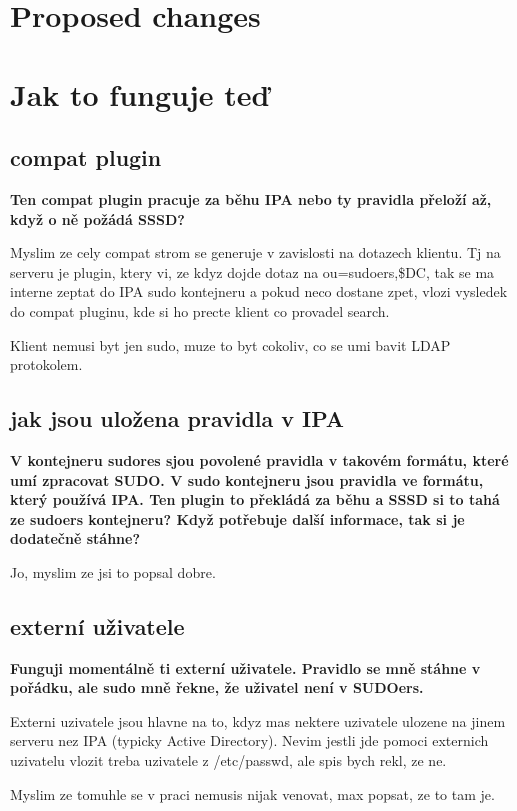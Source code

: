 \documentclass[12pt,a4paper,titlepage,final]{article}
\begin{document}
\section{Proposed changes}

\section{Jak to funguje teď}
\subsection{compat plugin}
\textbf{Ten compat plugin pracuje za běhu IPA nebo ty pravidla přeloží až, když
o ně požádá SSSD?}

Myslim ze cely compat strom se generuje v zavislosti na dotazech klientu. Tj
na serveru je plugin, ktery vi, ze kdyz dojde dotaz na ou=sudoers,\$DC,
tak se ma interne zeptat do IPA sudo kontejneru a pokud neco dostane zpet,
vlozi vysledek do compat pluginu, kde si ho precte klient co provadel search.

Klient nemusi byt jen sudo, muze to byt cokoliv, co se umi bavit LDAP
protokolem.

\subsection{jak jsou uložena pravidla v IPA}
\textbf{V kontejneru sudores sjou povolené pravidla v takovém formátu, které umí
zpracovat SUDO. V sudo kontejneru jsou pravidla ve formátu, který používá IPA.
Ten plugin to překládá za běhu a SSSD si to tahá ze sudoers kontejneru? Když
potřebuje další informace, tak si je dodatečně stáhne?}

Jo, myslim ze jsi to popsal dobre.

\subsection{externí uživatele}
\textbf{Funguji momentálně ti externí uživatele. Pravidlo se mně
stáhne v pořádku, ale sudo mně řekne, že uživatel není v SUDOers.}

Externi uzivatele jsou hlavne na to, kdyz mas nektere uzivatele
ulozene na jinem serveru nez IPA (typicky Active Directory). Nevim
jestli jde pomoci externich uzivatelu vlozit treba uzivatele z
/etc/passwd, ale spis bych rekl, ze ne.

Myslim ze tomuhle se v praci nemusis nijak venovat, max popsat, ze to tam je.
\end{document}
